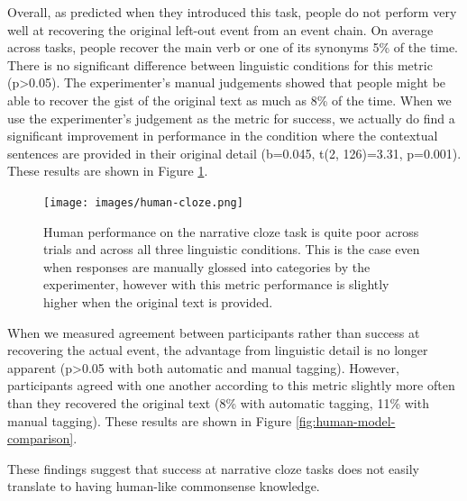 \documentclass[10pt,a4paper]{article}
\begin{document}
Overall, as  predicted when they introduced this task, people do not perform very well at recovering the original left-out event from an event chain. On average across tasks, people recover the main verb or one of its synonyms 5\% of the time. There is no significant difference between linguistic conditions for this metric (p>0.05). The experimenter's manual judgements showed that people might be able to recover the gist of the original text as much as 8\% of the time. When we use the experimenter's judgement as the metric for success, we actually do find a significant improvement in performance in the condition where the contextual sentences are provided in their original detail (b=0.045, t(2, 126)=3.31, p=0.001). These results are shown in Figure \ref{fig:human-cloze}.

\begin{figure}
 \centering
 \texttt{[image: images/human-cloze.png]}
 \caption{Human performance on the narrative cloze task is quite poor across trials and across all three linguistic conditions. This is the case even when responses are manually glossed into categories by the experimenter, however with this metric performance is slightly higher when the original text is provided.}
 \label{fig:human-cloze}
\end{figure}

When we measured agreement between participants rather than success at recovering the actual event, the advantage from linguistic detail is no longer apparent (p>0.05 with both automatic and manual tagging). However, participants agreed with one another according to this metric slightly more often than they recovered the original text (8\% with automatic tagging, 11\% with manual tagging). These results are shown in Figure \ref{fig:human-model-comparison}.


These findings suggest that success at narrative cloze tasks does not easily translate to having human-like commonsense knowledge.
\end{document}
